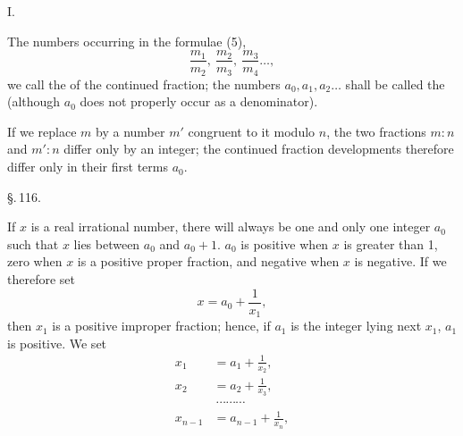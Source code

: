 

I. 

The numbers occurring in the formulae (5),
\[
\frac{m_1}{m_2}, \ \frac{m_2}{m_3}, \ \frac{m_3}{m_4} \ldots,
\]
we call the  of the continued fraction; the numbers $a_0, a_1, a_2 \ldots$ shall be called the  (although $a_0$ does not properly occur as a denominator).

If we replace $m$ by a number $m'$ congruent to it modulo $n$, the two fractions $m:n$ and $m':n$ differ only by an integer; the continued fraction developments therefore differ only in their first terms $a_0$.

\begin{center}
\S.\,116.

\end{center}

If $x$ is a real irrational number, there will always be one and only one integer $a_0$ such that $x$ lies between $a_0$ and $a_0 + 1$. $a_0$ is positive when $x$ is greater than 1, zero when $x$ is a positive proper fraction, and negative when $x$ is negative. If we therefore set
\[
x = a_0 + \frac{1}{x_1},
\]
then $x_1$ is a positive improper fraction; hence, if $a_1$ is the integer lying next  $x_1$, $a_1$ is positive. We set
\[
\begin{aligned}
x_1 &= a_1 + \frac{1}{x_2}, \\
x_2 &= a_2 + \frac{1}{x_3}, \\
&\ \cdots\cdots\cdots \\
x_{n-1} &= a_{n-1} + \frac{1}{x_n},
\end{aligned}
\]
